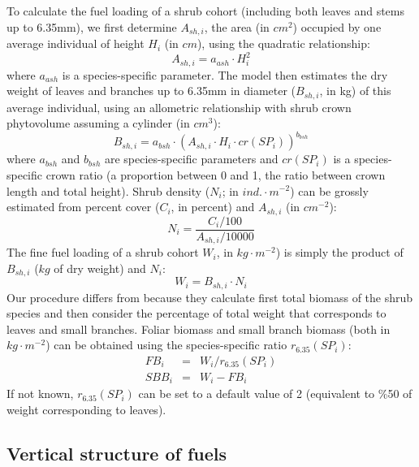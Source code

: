 \documentclass[]{book}
\begin{document}
To calculate the fuel loading of a shrub cohort (including both leaves and stems up to 6.35mm), we first determine \(A_{sh,i}\), the area (in \(cm^2\)) occupied by one average individual of height \(H_{i}\) (in \(cm\)), using the quadratic relationship:
\begin{equation}
A_{sh,i} = a_{ash} \cdot H_{i}^2
\end{equation}
where \(a_{ash}\) is a species-specific parameter. The model then estimates the dry weight of leaves and branches up to 6.35mm in diameter (\(B_{sh,i}\), in kg) of this average individual, using an allometric relationship with shrub crown phytovolume assuming a cylinder (in \(cm^3\)):
\begin{equation}
B_{sh,i} = a_{bsh} \cdot (A_{sh,i}\cdot H_{i}\cdot cr(SP_i))^{b_{bsh}}
\end{equation}
where \(a_{bsh}\) and \(b_{bsh}\) are species-specific parameters and \(cr(SP_i)\) is a species-specific crown ratio (a proportion between 0 and 1, the ratio between crown length and total height). Shrub density (\(N_{i}\); in \(ind.\cdot m^{-2}\)) can be grossly estimated from percent cover (\(C_{i}\), in percent) and \(A_{sh,i}\) (in \(cm^{-2}\)):
\begin{equation}
N_{i} = \frac{C_{i}/100}{A_{sh,i}/10000}
\end{equation}
The fine fuel loading of a shrub cohort \(W_{i}\), in \(kg \cdot m^{-2}\)) is simply the product of \(B_{sh,i}\) (\(kg\) of dry weight) and \(N_{i}\):
\begin{equation}
W_{i} =  B_{sh,i}\cdot N_{i}
\end{equation}
Our procedure differs from \citet{Prichard2013} because they calculate first total biomass of the shrub species and then consider the percentage of total weight that corresponds to leaves and small branches. Foliar biomass and small branch biomass (both in \(kg \cdot m^{-2}\)) can be obtained using the species-specific ratio \(r_{6.35}(SP_i)\):
\begin{eqnarray}
FB_{i} &=&  W_{i}/r_{6.35}(SP_i)\\
SBB_{i} &=& W_{i} - FB_{i}
\end{eqnarray}
If not known, \(r_{6.35}(SP_i)\) can be set to a default value of 2 (equivalent to \%50 of weight corresponding to leaves).

\hypertarget{vertical-structure-of-fuels}{%
\subsection{Vertical structure of fuels}\label{vertical-structure-of-fuels}}
\end{document}
